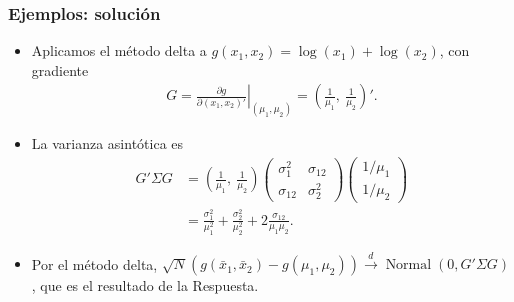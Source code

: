 \documentclass[t, compress, spanish, aspectratio=169]{beamer}
\DeclareMathOperator{\N}{Normal}
\newcommand{\dto}{\stackrel{d}{\longrightarrow}}
\begin{document}
	\begin{frame}
		\frametitle{Ejemplos: soluci\'on}
		\small
		\begin{itemize}
			\item Aplicamos el m\'etodo delta a $g(x_1,x_2)=\log(x_1)+\log(x_2)$, con gradiente
			\begin{align*}
			G = \left.\frac{\partial g}{\partial (x_1,x_2)'}\right|_{(\mu_1,\mu_2)} = \left(\frac{1}{\mu_1},\ \frac{1}{\mu_2}\right)'.
			\end{align*}
			\item [] La varianza asint\'otica es
			\begin{align*}
			G'\Sigma G &= \left(\frac{1}{\mu_1},\ \frac{1}{\mu_2}\right)
			\begin{pmatrix}\sigma_1^2 & \sigma_{12}\\ \sigma_{12} & \sigma_2^2\end{pmatrix}
			\begin{pmatrix}1/\mu_1\\ 1/\mu_2\end{pmatrix} \\
			&= \frac{\sigma_1^2}{\mu_1^2}+\frac{\sigma_2^2}{\mu_2^2}+2\frac{\sigma_{12}}{\mu_1\mu_2}.
			\end{align*}
			\item [] Por el m\'etodo delta, $\sqrt{N}(g(\bar x_1,\bar x_2)-g(\mu_1,\mu_2))\dto \N(0,G'\Sigma G)$, que es el resultado de la Respuesta.
		\end{itemize}
	\end{frame}

\end{document}
